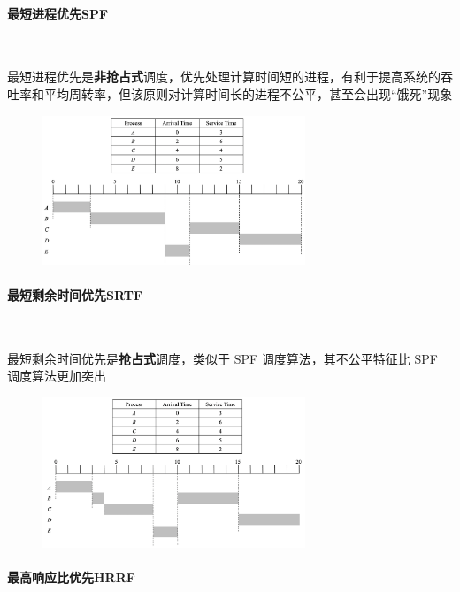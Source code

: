 \documentclass[cs4size,a4paper,10pt]{ctexart}
\begin{document}
	\paragraph{最短进程优先SPF}~{}

	最短进程优先是\textbf{非抢占式}调度，优先处理计算时间短的进程，有利于提高系统的吞吐率和平均周转率，但该原则对计算时间长的进程不公平，甚至会出现“饿死”现象

	\begin{figure}[H]
		\centering
		\includegraphics[width=0.7\textwidth]{img/SPF}
	\end{figure}


	\paragraph{最短剩余时间优先SRTF}~{}

	最短剩余时间优先是\textbf{抢占式}调度，类似于 SPF 调度算法，其不公平特征比 SPF 调度算法更加突出
	\begin{figure}[H]
		\centering
		\includegraphics[width=0.7\textwidth]{img/SRTF}
	\end{figure}

	\paragraph{最高响应比优先HRRF}~{}
	
\end{document}
